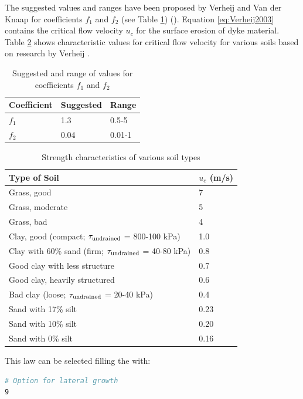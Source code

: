 \begin{itemize}
The suggested values and ranges have been proposed by Verheij and Van der Knaap
\cite{Verheij2003} for coefficients $f_1$ and $f_2$ (see Table \ref{tab:coef:verheij2003})
(\cite{Curran2018,VanDamme2020}).
Equation \eqref{eq:Verheij2003} contains the critical flow velocity $u_c$ for
the surface erosion of dyke material.
Table \ref{tab:uc} shows characteristic values for critical flow velocity for
various soils based on research by Verheij \cite{Verheij2002}.
\begin{table}
\centering
\caption{Suggested and range of values for coefficients $f_1$ and $f_2$}
\begin{tabular}{lll}
\hline
Coefficient & Suggested & Range \\
\hline
$f_1$ & 1.3 & 0.5-5 \\
$f_2$ & 0.04 & 0.01-1 \\
\hline
\end{tabular}
\label{tab:coef:verheij2003}
\end{table}
\begin{table}
\centering
\caption{Strength characteristics of various soil types \cite{Verheij2003}\cite{Verheij2009}}
\begin{tabular}{ll}
\hline
Type of Soil & $u_c$ (m/s) \\
\hline
Grass, good & 7 \\
Grass, moderate & 5 \\
Grass, bad & 4 \\
Clay, good (compact; $\tau_{\rm{undrained}}$ = 800-100 kPa) & 1.0 \\
Clay with 60\% sand (firm; $\tau_{\rm{undrained}}$ = 40-80 kPa) & 0.8 \\
Good clay with less structure & 0.7 \\
Good clay, heavily structured & 0.6 \\
Bad clay (loose; $\tau_{\rm{undrained}}$ = 20-40 kPa) & 0.4 \\
Sand with 17\% silt & 0.23 \\
Sand with 10\% silt & 0.20 \\
Sand with 0\% silt & 0.16 \\
\hline
\end{tabular}
\label{tab:uc}
\end{table}

This law can be selected filling the  with:
\begin{lstlisting}[language=bash]
# Option for lateral growth
9
\end{lstlisting}
\end{itemize}
